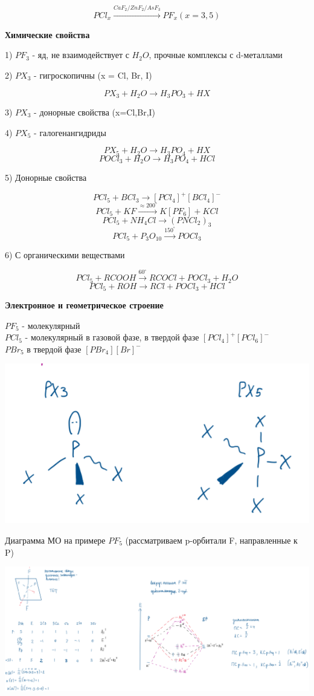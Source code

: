 \documentclass[14pt,a4paper]{scrartcl}
\begin{document}
$$PCl_x \xrightarrow{CaF_2/ZnF_2/AsF_3} PF_x(x=3,5)$$

\textbf{Химические свойства}

1) $PF_3$ - яд, не взаимодействует с $H_2O$, прочные комплексы с d-металлами

2) $PX_3$ - гигроскопичны (x = Cl, Br, I)

$$PX_3 + H_2O \rightarrow H_3PO_3 + HX$$

3) $PX_3$ - донорные свойства (x=Cl,Br,I)

4) $PX_5$ - галогенангидриды

$$PX_5 + H_2O \rightarrow H_3PO_4 + HX$$
$$POCl_3 + H_2O \rightarrow H_3PO_4 + HCl$$

5) Донорные свойства

$$PCl_5 + BCl_3 \rightarrow [PCl_4]^+[BCl_4]^-$$
$$PCl_5 + KF \xrightarrow{\approx 200^{\circ}} K[PF_6] + KCl$$
$$PCl_5 + NH_4Cl \rightarrow (PNCl_2)_3$$
$$PCl_5 + P_3O_10 \xrightarrow{150^{\circ}} POCl_3$$

6) С органическими веществами

$$PCl_5 + RCOOH \xrightarrow{60^{\circ}} RCOCl + POCl_3 + H_2O$$
$$PCl_5 + ROH \rightarrow RCl + POCl_3 + HCl$$

\textbf{Электронное и геометрическое строение}

$PF_5$ - молекулярный\\
$PCl_5$ - молекулярный в газовой фазе, в твердой фазе $[PCl_4]^{+}[PCl_6]^-$\\
$PBr_5$ в твердой фазе $[PBr_4][Br]^-$

\includegraphics{9v3.png}

Диаграмма МО на примере $PF_5$ (рассматриваем p-орбитали F, направленные к P)

\includegraphics[scale=0.75]{9v4.png}
\end{document}
